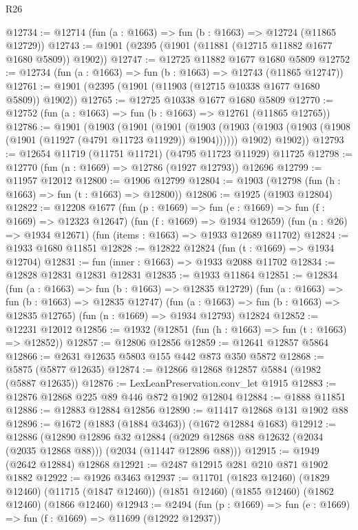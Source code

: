 \begin{lexlean}{R26}
\begin{coremodule}
@12734 := @12714 (fun (a : @1663) => fun (b : @1663) => @12724 (@11865 @12729))
@12743 := @1901 (@2395 (@1901 (@11881 (@12715 @11882 @1677 @1680 @5809)) @1902))
@12747 := @12725 @11882 @1677 @1680 @5809
@12752 := @12734 (fun (a : @1663) => fun (b : @1663) => @12743 (@11865 @12747))
@12761 := @1901 (@2395 (@1901 (@11903 (@12715 @10338 @1677 @1680 @5809)) @1902))
@12765 := @12725 @10338 @1677 @1680 @5809
@12770 := @12752 (fun (a : @1663) => fun (b : @1663) => @12761 (@11865 @12765))
@12786 := @1901
    (@1903
      (@1901
        (@1901
          (@1903 (@1903 (@1903 (@1903 (@1908 (@1901 (@11927 (@4791 @11723 @11929)) @1904))))))
          @1902)
        @1902))
@12793 := @12654 @11719 (@11751 @11721) (@4795 @11723 @11929) @11725
@12798 := @12770 (fun (n : @1669) => @12786 (@1927 @12793)) @12696
@12799 := @11957 @12012
@12800 := @1906 @12799
@12804 := @1903 (@12798 (fun (h : @1663) => fun (t : @1663) => @12800))
@12806 := @1925 (@1903 @12804)
@12822 := @12208
    @1677
    (fun (p : @1669) => fun (e : @1669) => fun (f : @1669) => @12323 @12647)
    (fun (f : @1669) => @1934 @12659)
    (fun (n : @26) => @1934 @12671)
    (fun (items : @1663) => @1933 @12689 @11702)
@12824 := @1933 @1680 @11851
@12828 := @12822 @12824 (fun (t : @1669) => @1934 @12704)
@12831 := fun (inner : @1663) => @1933 @2088 @11702
@12834 := @12828 @12831 @12831 @12831
@12835 := @1933 @11864
@12851 := @12834
    (fun (a : @1663) => fun (b : @1663) => @12835 @12729)
    (fun (a : @1663) => fun (b : @1663) => @12835 @12747)
    (fun (a : @1663) => fun (b : @1663) => @12835 @12765)
    (fun (n : @1669) => @1934 @12793)
    @12824
@12852 := @12231 @12012
@12856 := @1932 (@12851 (fun (h : @1663) => fun (t : @1663) => @12852))
@12857 := @12806 @12856
@12859 := @12641 @12857 @5864
@12866 := @2631 @12635 @5803 @155 @442 @873 @350 @5872
@12868 := @5875 (@5877 @12635)
@12874 := @12866 @12868 @12857 @5884 (@1982 (@5887 @12635))
@12876 := LexLeanPreservation.conv_let @1915
@12883 := @12876 @12868 @225 @89 @446 @872 @1902 @12804
@12884 := @1888 @11851
@12886 := @12883 @12884 @12856
@12890 := @11417 @12868 @131 @1902 @88
@12896 := @1672 (@1883 (@1884 @3463)) (@1672 @12884 @1683)
@12912 := @12886
    (@12890
      @12896
      @32
      @12884
      (@2029 @12868 @88 @12632 (@2034 (@2035 @12868 @88)))
      (@2034 (@11447 @12896 @88)))
@12915 := @1949 (@2642 @12884) @12868
@12921 := @2487 @12915 @281 @210 @871 @1902 @1882
@12922 := @1926 @3463
@12937 := @11701
    (@1823 @12460)
    (@1829 @12460)
    (@11715 (@1847 @12460))
    (@1851 @12460)
    (@1855 @12460)
    (@1862 @12460)
    (@1866 @12460)
@12943 := @2494 (fun (p : @1669) => fun (e : @1669) => fun (f : @1669) => @11699 (@12922 @12937))

\end{coremodule}
\end{lexlean}
